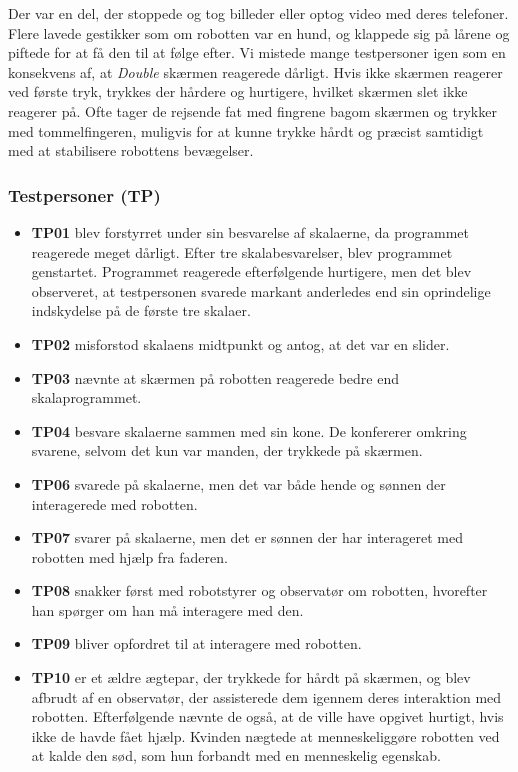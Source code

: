Der var en del, der stoppede og tog billeder eller optog video med deres telefoner. Flere lavede gestikker som om robotten var en hund, og klappede sig på lårene og piftede for at få den til at følge efter. Vi mistede mange testpersoner igen som en konsekvens af, at \textit{Double} skærmen reagerede dårligt. Hvis ikke skærmen reagerer ved første tryk, trykkes der hårdere og hurtigere, hvilket skærmen slet ikke reagerer på. Ofte tager de rejsende fat med fingrene bagom skærmen og trykker med tommelfingeren, muligvis for at kunne trykke hårdt og præcist samtidigt med at stabilisere robottens bevægelser.

\subsubsection{Testpersoner (TP)}
\begin{itemize}
\item \textbf{TP01} blev forstyrret under sin besvarelse af skalaerne, da programmet reagerede meget dårligt. Efter tre skalabesvarelser, blev programmet genstartet. Programmet reagerede efterfølgende hurtigere, men det blev observeret, at testpersonen svarede markant anderledes end sin oprindelige indskydelse på de første tre skalaer. 
\item \textbf{TP02} misforstod skalaens midtpunkt og antog, at det var en slider. 
\item \textbf{TP03} nævnte at skærmen på robotten reagerede bedre end skalaprogrammet.
\item \textbf{TP04} besvare skalaerne sammen med sin kone. De konfererer omkring svarene, selvom det kun var manden, der trykkede på skærmen.
\item \textbf{TP06} svarede på skalaerne, men det var både hende og sønnen der interagerede med robotten.
\item \textbf{TP07} svarer på skalaerne, men det er sønnen der har interageret med robotten med hjælp fra faderen.
\item \textbf{TP08} snakker først med robotstyrer og observatør om robotten, hvorefter han spørger om han må interagere med den.
\item \textbf{TP09} bliver opfordret til at interagere med robotten.
\item \textbf{TP10} er et ældre ægtepar, der trykkede for hårdt på skærmen, og blev afbrudt af en observatør, der assisterede dem igennem deres interaktion med robotten. Efterfølgende nævnte de også, at de ville have opgivet hurtigt, hvis ikke de havde fået hjælp. Kvinden nægtede at menneskeliggøre robotten ved at kalde den sød, som hun forbandt med en menneskelig egenskab.

\end{itemize}
